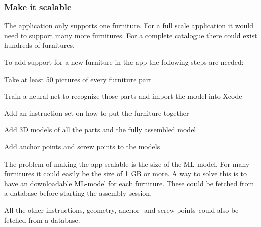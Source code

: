 \subsubsection{Make it scalable}
The application only supports one furniture. For a full scale application it would need to support
many more furnitures. For a complete catalogue there could exist hundreds of furnitures.

To add support for a new furniture in the app the following steps are needed:

\begin{list}{•}
\item Take at least 50 pictures of every furniture part
\item Train a neural net to recognize those parts and import the model into Xcode
\item Add an instruction set on how to put the furniture together
\item Add 3D models of all the parts and the fully assembled model
\item Add anchor points and screw points to the models
\end{list}

The problem of making the app scalable is the size of the ML-model. For many furnitures it could
easily be the size of 1 GB or more. A way to solve this is to have an downloadable ML-model for each 
furniture. These could be fetched from a database before starting the assembly session.

All the other instructions, geometry, anchor- and screw points could also be fetched from a database.

